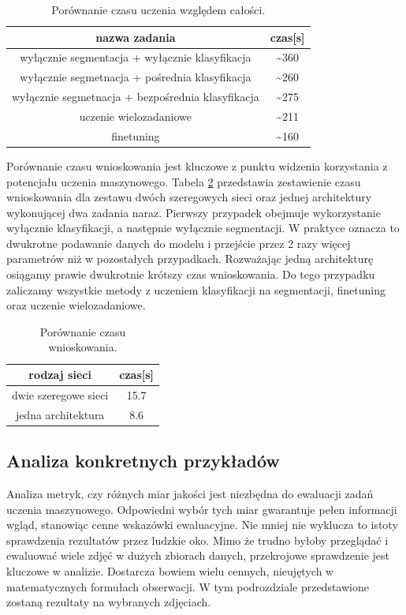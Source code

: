 \begin{table}[ht!]
    \centering
    \begin{tabular}{c|c}
        nazwa zadania                      &   czas{[}s{]} \\ \hline
        wyłącznie segmentacja +  wyłącznie klasyfikacja & \textasciitilde 360 \\
        wyłącznie segmetnacja + pośrednia klasyfikacja & \textasciitilde 260 \\
        wyłącznie segmetnacja + bezpośrednia klasyfikacja & \textasciitilde 275 \\
        uczenie wielozadaniowe                   &   \textasciitilde 211 \\
        finetuning                        &   \textasciitilde 160 
\end{tabular}
\caption{Porównanie czasu uczenia względem całości.}
\label{tab:por-trening-all}
\end{table}


Porównanie czasu wnioskowania jest kluczowe z punktu widzenia korzystania z potencjału uczenia maszynowego. Tabela \ref{tab:por-infer} przedstawia zestawienie czasu wnioskowania dla zestawu dwóch szeregowych sieci oraz jednej architektury wykonującej dwa zadania naraz. Pierwszy przypadek obejmuje wykorzystanie wyłącznie klasyfikacji, a następnie wyłącznie segmentacji. W praktyce oznacza to dwukrotne podawanie danych do modelu i przejście przez 2 razy więcej parametrów niż w pozostałych przypadkach. Rozważając jedną architekturę osiągamy prawie dwukrotnie krótszy czas wnioskowania. Do tego przypadku zaliczamy wszystkie metody z uczeniem klasyfikacji na segmentacji, finetuning oraz uczenie wielozadaniowe.


\begin{table}[ht!]
    \centering
    \begin{tabular}{c|c}
        rodzaj sieci                      &   czas{[}s{]} \\ \hline
        dwie szeregowe sieci                  &   15.7\\
        jedna architektura               &   8.6
\end{tabular}
\caption{Porównanie czasu wnioskowania.}
\label{tab:por-infer}
\end{table}

\subsection{Analiza konkretnych przykładów}
Analiza metryk, czy różnych miar jakości jest niezbędna do ewaluacji zadań uczenia maszynowego. Odpowiedni wybór tych miar gwarantuje pełen informacji wgląd, stanowiąc cenne wskazówki ewaluacyjne. Nie mniej nie wyklucza to istoty sprawdzenia rezultatów przez ludzkie oko. Mimo że trudno byłoby przeglądać i ewaluować wiele zdjęć w dużych zbiorach danych, przekrojowe sprawdzenie jest kluczowe w analizie. Dostarcza bowiem wielu cennych, nieujętych w matematycznych formułach obserwacji. W tym podrozdziale przedstawione zostaną rezultaty na wybranych zdjęciach.
